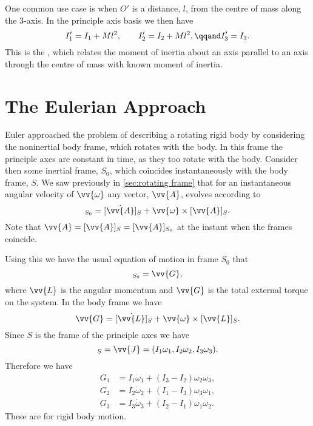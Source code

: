\documentclass[fleqn]{NotesClass}
\begin{document}
    One common use case is when \(O'\) is a distance, \(l\), from the centre of mass along the \(3\)-axis.
    In the principle axis basis we then have
    \begin{equation}
        I_1' = I_1 + Ml^2, \qquad I_2' = I_2 + Ml^2, \qqand I_3' = I_3.
    \end{equation}
    This is the , which relates the moment of inertia about an axis parallel to an axis through the centre of mass with known moment of inertia.
    
    \section{The Eulerian Approach}
    Euler approached the problem of describing a rotating rigid body by considering the noninertial body frame, which rotates with the body.
    In this frame the principle axes are constant in time, as they too rotate with the body.
    Consider then some inertial frame, \(S_0\), which coincides instantaneously with the body frame, \(S\).
    We saw previously in \cref{sec:rotating frame} that for an instantaneous angular velocity of \(\vv{\omega}\) any vector, \(\vv{A}\), evolves according to
    \begin{equation}
        [\dot{\vv{A}}]_{S_0} = [\dot{\vv{A}}]_{S} + \vv{\omega} \times [\vv{A}]_{S}.
    \end{equation}
    Note that \(\vv{A} = [\vv{A}]_S = [\vv{A}]_{S_0}\) at the instant when the frames coincide.
    
    Using this we have the usual equation of motion in frame \(S_0\) that
    \begin{equation}
        [\dot{\vv{L}}]_{S_0} = \vv{G},
    \end{equation}
    where \(\vv{L}\) is the angular momentum and \(\vv{G}\) is the total external torque on the system.
    In the body frame we have
    \begin{equation}
        \vv{G} = [\dot{\vv{L}}]_S + \vv{\omega} \times [\vv{L}]_S.
    \end{equation}
    Since \(S\) is the frame of the principle axes we have
    \begin{equation}
        [\vv{L}]_S = \vv{J} = (I_1\omega_1, I_2\omega_2, I_3\omega_3).
    \end{equation}
    Therefore we have
    \begin{align}
        G_1 &= I_1\dot{\omega}_1 + (I_3 - I_2)\omega_2\omega_3,\\
        G_2 &= I_2\dot{\omega}_2 + (I_1 - I_3)\omega_3\omega_1,\\
        G_3 &= I_3\dot{\omega}_3 + (I_2 - I_1)\omega_1\omega_2.
    \end{align}
    These are  for rigid body motion.
    
\end{document}
